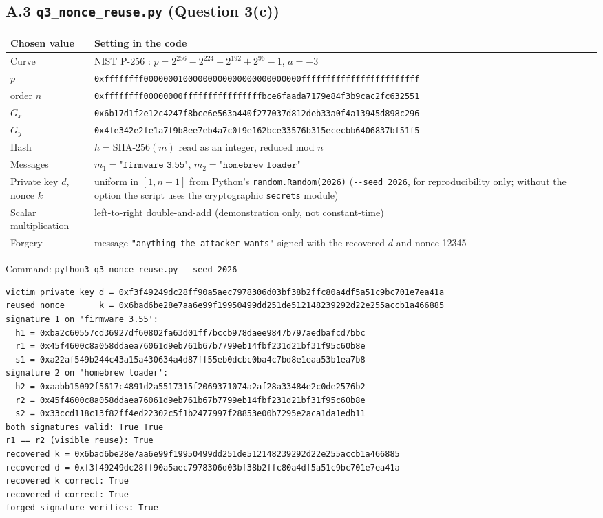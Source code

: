 \documentclass[11pt,a4paper]{article}
\begin{document}
\clearpage
\subsection*{A.3 \texttt{q3\_nonce\_reuse.py} (Question 3(c))}
\begin{table}[H]
\centering\small
\begin{tabularx}{\textwidth}{@{}P{3.4cm}L@{}}
\toprule
Chosen value & Setting in the code \\
\midrule
Curve & NIST P-256 \cite{fips1865,sp800186}: $p = 2^{256} - 2^{224} + 2^{192} + 2^{96} - 1$, $a = -3$ \\
\quad $p$ & \texttt{0xffffffff00000001000000000000000000000000ffffffffffffffffffffffff} \\
\quad order $n$ & \texttt{0xffffffff00000000ffffffffffffffffbce6faada7179e84f3b9cac2fc632551} \\
\quad $G_x$ & \texttt{0x6b17d1f2e12c4247f8bce6e563a440f277037d812deb33a0f4a13945d898c296} \\
\quad $G_y$ & \texttt{0x4fe342e2fe1a7f9b8ee7eb4a7c0f9e162bce33576b315ececbb6406837bf51f5} \\
Hash & $h = \text{SHA-256}(m)$ read as an integer, reduced mod $n$ \\
Messages & $m_1 = \texttt{"firmware 3.55"}$, $m_2 = \texttt{"homebrew loader"}$ \\
Private key $d$, nonce $k$ & uniform in $[1, n-1]$ from Python's \texttt{random.Random(2026)} (\texttt{-{}-seed 2026}, for reproducibility only; without the option the script uses the cryptographic \texttt{secrets} module) \\
Scalar multiplication & left-to-right double-and-add (demonstration only, not constant-time) \\
Forgery & message \texttt{"anything the attacker wants"} signed with the recovered $d$ and nonce 12345 \\
\bottomrule
\end{tabularx}
\end{table}
Command: \texttt{python3 q3\_nonce\_reuse.py -{}-seed 2026}
\begin{Verbatim}[fontsize=\footnotesize, frame=single]
victim private key d = 0xf3f49249dc28ff90a5aec7978306d03bf38b2ffc80a4df5a51c9bc701e7ea41a
reused nonce       k = 0x6bad6be28e7aa6e99f19950499dd251de512148239292d22e255accb1a466885
signature 1 on 'firmware 3.55':
  h1 = 0xba2c60557cd36927df60802fa63d01ff7bccb978daee9847b797aedbafcd7bbc
  r1 = 0x45f4600c8a058ddaea76061d9eb761b67b7799eb14fbf231d21bf31f95c60b8e
  s1 = 0xa22af549b244c43a15a430634a4d87ff55eb0dcbc0ba4c7bd8e1eaa53b1ea7b8
signature 2 on 'homebrew loader':
  h2 = 0xaabb15092f5617c4891d2a5517315f2069371074a2af28a33484e2c0de2576b2
  r2 = 0x45f4600c8a058ddaea76061d9eb761b67b7799eb14fbf231d21bf31f95c60b8e
  s2 = 0x33ccd118c13f82ff4ed22302c5f1b2477997f28853e00b7295e2aca1da1edb11
both signatures valid: True True
r1 == r2 (visible reuse): True
recovered k = 0x6bad6be28e7aa6e99f19950499dd251de512148239292d22e255accb1a466885
recovered d = 0xf3f49249dc28ff90a5aec7978306d03bf38b2ffc80a4df5a51c9bc701e7ea41a
recovered k correct: True
recovered d correct: True
forged signature verifies: True
\end{Verbatim}
\end{document}
